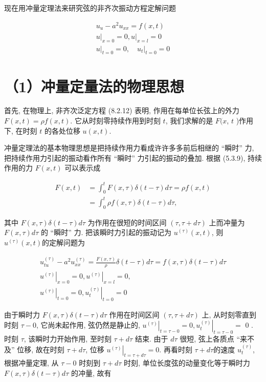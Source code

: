 现在用冲量定理法来研究弦的非齐次振动方程定解问题

$$
\begin{gathered}
u_{u}-a^{2} u_{x x}=f(x, t) \\
\left.u\right|_{x=0}=0,\left.u\right|_{x=l}=0 \\
\left.u\right|_{t=0}=0,\left.\quad u_{t}\right|_{t=0}=0
\end{gathered}
$$

\section{（1）冲量定量法的物理思想}
首先, 在物理上, 非齐次泛定方程 (8.2.12) 表明, 作用在每单位长弦上的外力 $F(x, t)=\rho f(x, t)$. 它从时刻零持续作用到时刻 $t$, 我们求解的是 $F(x$, $t$ )作用下, 在时刻 $t$ 的各处位移 $u(x, t)$.

冲量定理法的基本物理思想是把持续作用力看成许许多多前后相继的 “瞬时” 力, 把持续作用力引起的振动看作所有 “瞬时” 力引起的振动的叠加. 根据 (5.3.9), 持续作用的力 $F(x, t)$ 可以表示成

$$
\begin{aligned}
F(x, t) & =\int_{0}^{t} F(x, \tau) \delta(t-\tau) d \tau=\rho f(x, t) \\
& =\int_{0}^{t} \rho f(x, \tau) \delta(t-\tau) d \tau,
\end{aligned}
$$

其中 $F(x, \tau) \delta(t-\tau) d \tau$ 为作用在很短的时间区间 $(\tau, \tau+d \tau)$ 上而冲量为 $F(x, \tau) d \tau$ 的 “瞬时” 力. 把该瞬时力引起的振动记为 $u^{(\tau)}(x, t)$, 则 $u^{(\tau)}(x, t)$的定解问题为

$$
\begin{gathered}
u_{t u}^{(\tau)}-a^{2} u_{x x}^{(\tau)}=\frac{F(x, \tau)}{\rho} \delta(t-\tau) d \tau=f(x, \tau) \delta(t-\tau) d \tau \\
\left.u^{(\tau)}\right|_{x=0}=0,\left.u^{(\tau)}\right|_{x=l}=0, \\
\left.u^{(\tau)}\right|_{t=0}=0,\left.u_{t}^{(\tau)}\right|_{t=0}=0
\end{gathered}
$$

由于瞬时力 $F(x, \tau) \delta(t-\tau) d \tau$ 作用在时间区间 $(\tau, \tau+d \tau)$ 上, 从时刻零直到时刻 $\tau-0$, 它尚未起作用, 弦仍然是静止的, $\left.u^{(\tau)}\right|_{t=\tau-0}=0,\left.u_{t}^{(\tau)}\right|_{t=\tau-0}=$ 0 . 时刻 $\tau$, 该瞬时力开始作用, 至时刻 $\tau+d \tau$ 结束. 由于 $d \tau$ 很短, 弦上各质点 “来不及” 位移, 故在时刻 $\tau+d \tau$, 位移 $\left.u^{(\tau)}\right|_{t=\tau+d \tau}=0$. 再看时刻 $\tau+d \tau$的速度 $u_{t}^{(\tau)}$, 根据冲量定理, 从 $\tau-0$ 时刻到 $\tau+d \tau$ 时刻, 单位长度弦的动量变化等于瞬时力 $F(x, \tau) \delta(t-\tau) d \tau$ 的冲量, 故有

